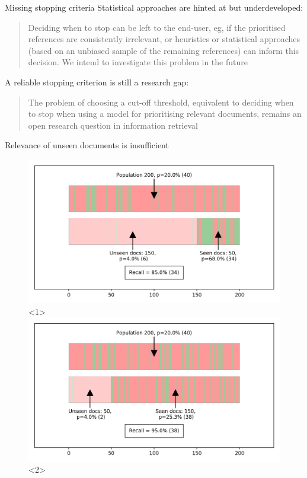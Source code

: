 \documentclass[9pt]{beamer}
\begin{document}
\begin{frame}{Missing stopping criteria}
Statistical approaches are hinted at but underdeveloped:


\blockcquote{Przybya2018}{Deciding when to stop can be left to the end-user, eg, if the prioritised references are consistently irrelevant, or heuristics or statistical approaches (based on an unbiased sample of the remaining references) can inform this decision. We intend to investigate this problem in the future}

\medskip

A reliable stopping criterion is still a research gap:

\blockcquote{bannach-brown2019}{The problem of choosing a cut-off threshold, equivalent to deciding when to stop when using a model for prioritising relevant documents, remains an open research question in information retrieval}

\end{frame}

\begin{frame}{Relevance of unseen documents is insufficient}
\begin{figure}
	\includegraphics[width=\linewidth]{../images/proportions_1}<1>
	\includegraphics[width=\linewidth]{../images/proportions_2}<2>
\end{figure}
\end{frame}
\end{document}
